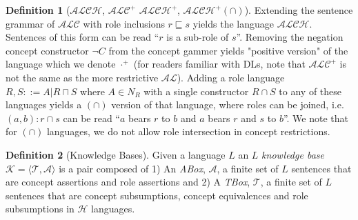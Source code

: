 \documentclass[letterpaper]{article} %
\theoremstyle{definition}
\theoremstyle{definition}
\newtheorem{definition}{Definition}
\theoremstyle{definition}
\theoremstyle{definition}
\theoremstyle{definition}
\newcommand{\isa}{\mathbin{{:}}}
\begin{document}
\begin{definition}[$\mathcal{ALCH}$, $\mathcal{ALC}^+$ $\mathcal{ALCH^+}$, $\mathcal{ALCH^+(\cap)}$]
Extending the sentence grammar of $\mathcal{ALC}$ with role inclusions $r \sqsubseteq s$ yields the language $\mathcal{ALCH}$. Sentences of this form can be read ``$r$ is a sub-role of $s$''. Removing the negation concept constructor $\lnot C$ from the concept gammer yields "positive version" of the language which we denote $\cdot^+$ (for readers familiar with DLs, note that $\mathcal{ALC^+}$ is not the same as the more restrictive $\mathcal{AL}$). Adding a role language $R,S::= A |R \sqcap S$ where $A \in N_R$ with a single constructor $R \cap S$ to any of these languages yields a $(\cap)$ version of that language, where roles can be joined, i.e. $(a, b) \isa r \cap s$ can be read ``$a$ bears $r$ to $b$ and $a$ bears $r$ and $s$ to $b$''. We note that for $(\cap)$ languages, we do not allow role intersection in concept restrictions.
\end{definition}

\begin{definition}[Knowledge Bases]
    Given a language $L$ an $L$ \textit{knowledge base} $\mathcal{K} = \langle\mathcal{T}, \mathcal{A}\rangle$ is a pair composed of 1) An \textit{ABox}, $\mathcal{A}$, a finite set of $L$ sentences that are concept assertions and role assertions and 2) A {\it TBox}, $\mathcal{T}$, a finite set of $L$ sentences that are concept subsumptions, concept equivalences and role subsumptions in $\mathcal{H}$ languages.
\end{definition}

\end{document}
